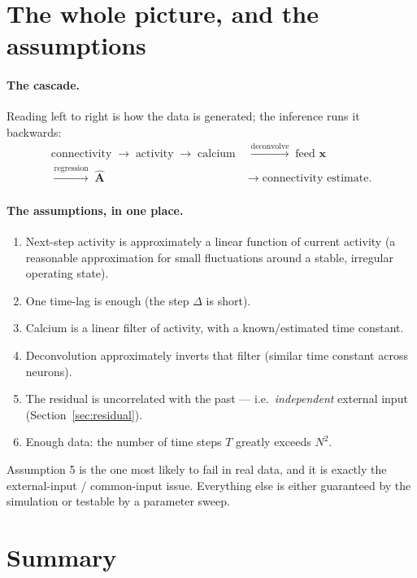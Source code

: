\documentclass[11pt,a4paper]{article}
\newcommand{\xx}{\mathbf{x}}
\newcommand{\Amat}{\mathbf{A}}
\begin{document}
\section{The whole picture, and the assumptions}
\label{sec:assumptions}

\paragraph{The cascade.}
Reading left to right is how the data is generated; the inference runs it
backwards:
\[
\begin{aligned}
\text{connectivity} \;\to\; \text{activity} \;\to\; \text{calcium}
\;&\xrightarrow{\text{deconvolve}}\; \text{feed }\xx\\[-2pt]
\xrightarrow{\text{regression}}\; \widehat{\Amat} \;&\to\; \text{connectivity estimate.}
\end{aligned}
\]

\paragraph{The assumptions, in one place.}
\begin{enumerate}
\item Next-step activity is approximately a linear function of current activity
(a reasonable approximation for small fluctuations around a stable, irregular
operating state).
\item One time-lag is enough (the step $\Delta$ is short).
\item Calcium is a linear filter of activity, with a known/estimated time constant.
\item Deconvolution approximately inverts that filter (similar time constant across neurons).
\item The residual is uncorrelated with the past --- i.e.\ \emph{independent} external input (Section~\ref{sec:residual}).
\item Enough data: the number of time steps $T$ greatly exceeds $N^2$.
\end{enumerate}
Assumption 5 is the one most likely to fail in real data, and it is exactly the
external-input / common-input issue. Everything else is either guaranteed by the
simulation or testable by a parameter sweep.

\section*{Summary}
\end{document}
